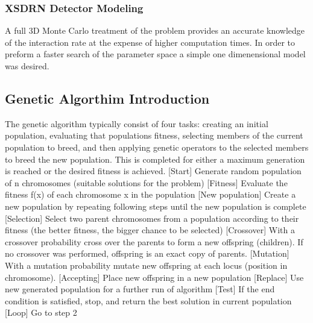 \subsubsection{XSDRN Detector Modeling}
A full 3D Monte Carlo treatment of the problem provides an accurate knowledge of the interaction rate at the expense of higher computation times. 
In order to preform a faster search of the parameter space a simple one dimenensional model was desired.
\subsection{Genetic Algorthim Introduction}
The genetic algorithm typically consist of four tasks: creating an initial population, evaluating that populations fitness, selecting members of the current population to breed, and then applying genetic operators to the selected members to breed the new population. 
This is completed for either a maximum generation is reached or the desired fitness is achieved. 
[Start] Generate random population of n chromosomes (suitable solutions for the problem)
[Fitness] Evaluate the fitness f(x) of each chromosome x in the population
[New population] Create a new population by repeating following steps until the new population is complete
[Selection] Select two parent chromosomes from a population according to their fitness (the better fitness, the bigger chance to be selected)
[Crossover] With a crossover probability cross over the parents to form a new offspring (children). If no crossover was performed, offspring is an exact copy of parents.
[Mutation] With a mutation probability mutate new offspring at each locus (position in chromosome).
[Accepting] Place new offspring in a new population
[Replace] Use new generated population for a further run of algorithm
[Test] If the end condition is satisfied, stop, and return the best solution in current population
[Loop] Go to step 2

